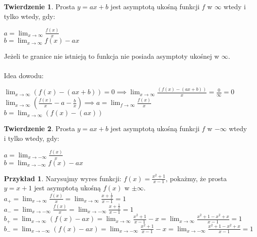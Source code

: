 \documentclass{article}
\theoremstyle{definition}
\theoremstyle{definition}
\newtheorem{tw}{Twierdzenie}[subsection]
\theoremstyle{definition}
\newtheorem{pk}{Przykład}[subsection]
\theoremstyle{definition}
\begin{document}
\begin{tw}
    Prosta $y=ax+b$ jest asymptotą ukośną funkcji $f$ w $\infty$ wtedy i tylko wtedy, gdy:
    \begin{center}
        $a=\lim_{x\rightarrow \infty} \frac{f(x)}{x}$\\
        $b=\lim_{x\rightarrow \infty} f(x)-ax$
    \end{center}
    Jeżeli te granice nie istnieją to funkcja nie posiada asymptoty ukośnej w $\infty$.\\\\
    Idea dowodu:\\
    \begin{center}
    $\lim_{x\rightarrow \infty} (f(x)-(ax+b))=0 \implies \lim_{x\rightarrow \infty} \frac{(f(x)-(ax+b))}{x}=\frac{0}{\infty}=0$\\
    $\lim_{x\rightarrow \infty} (\frac{f(x)}{x}-a-\frac{b}{x})\implies a = \lim_{f\rightarrow \infty} \frac{f(x)}{x}$\\
    $b=\lim_{x\rightarrow \infty} (f(x)-(ax))$
    \end{center}
\end{tw}

\begin{tw}
    Prosta $y=ax+b$ jest asymptotą ukośną funkcji $f$ w $- \infty$ wtedy i tylko wtedy, gdy:
    \begin{center}
        $a=\lim_{x\rightarrow -\infty} \frac{f(x)}{x}$\\
        $b=\lim_{x\rightarrow -\infty} f(x)-ax$
    \end{center}
\end{tw}

\begin{pk}
    Narysujmy wyres funkcji: $f(x)=\frac{x^2+1}{x-1}$, pokażmy, że prosta $y=x+1$ jest asymptotą ukośną $f(x)$ w $\pm \infty$.\\
    $a_{+}= \lim_{x\rightarrow \infty} \frac{f(x)}{x}=\lim_{x\rightarrow \infty} \frac{x+\frac{1}{x}}{x-1}=1$\\
    $a_{-}= \lim_{x\rightarrow -\infty} \frac{f(x)}{x}=\lim_{x\rightarrow -\infty} \frac{x+\frac{1}{x}}{x-1}=1$\\
    $b_{+}= \lim_{x\rightarrow \infty} (f(x)-ax) = \lim_{x\rightarrow \infty} \frac{x^2+1}{x-1} - x = \lim_{x\rightarrow \infty} \frac{x^2+1-x^2+x}{x-1} = 1$\\
    $b_{-}= \lim_{x\rightarrow -\infty} (f(x)-ax) = \lim_{x\rightarrow -\infty} \frac{x^2+1}{x-1} - x = \lim_{x\rightarrow -\infty} \frac{x^2+1-x^2+x}{x-1} = 1$\\
\end{pk}
\end{document}

